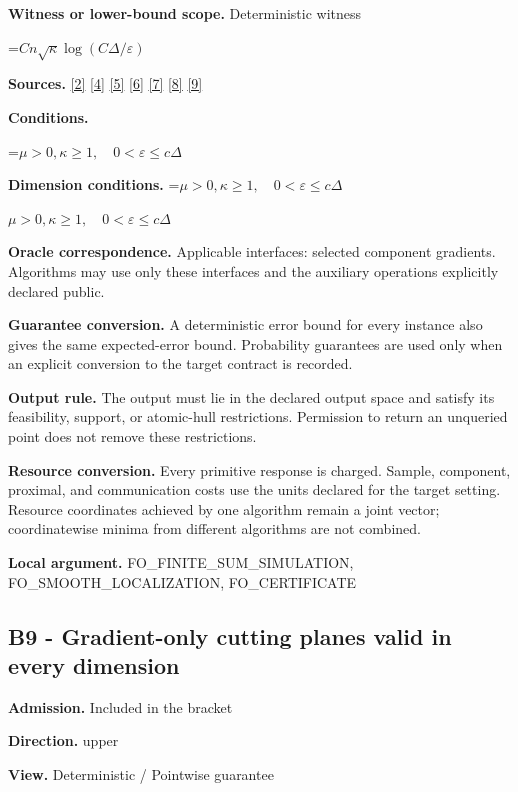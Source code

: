 \documentclass[10pt,a4paper]{article}
\newcommand{\AtlasMath}[1]{\par\begingroup\centering\setbox0=\hbox{$\displaystyle #1$}\ifdim\wd0>1.4\linewidth\typeout{ATLAS WIDE FORMULA: \the\wd0}\fi\ifdim\wd0>\linewidth\resizebox{\linewidth}{!}{\box0}\else\box0\fi\par\endgroup}
\newcommand{\AtlasInlineMath}[1]{\begingroup\setbox0=\hbox{$#1$}\ifdim\wd0>.4\linewidth\endgroup\AtlasMath{#1}\else\endgroup$#1$\fi}
\begin{document}
\textbf{Witness or lower-bound scope.} Deterministic witness

\AtlasMath{Cn\sqrt\kappa\log(C\Delta/\varepsilon)}
\textbf{Sources.} \href{https://proceedings.mlr.press/v97/zhou19b/zhou19b.pdf}{[2]} \href{https://arxiv.org/pdf/1405.4980}{[4]} \href{https://arxiv.org/pdf/2101.09740v2}{[5]} \href{https://arxiv.org/pdf/2609.33360v2}{[6]} \href{https://arxiv.org/pdf/2609.10874}{[7]} \href{https://www2.isye.gatech.edu/~nemirovs/MOR_AccuracyCertificates.pdf}{[8]} \href{https://arxiv.org/pdf/2609.20701}{[9]}

\textbf{Conditions.} 
\AtlasMath{\mu>0,\kappa\ge1,\quad0<\varepsilon\le c\Delta}


\textbf{Dimension conditions.} \AtlasInlineMath{\mu>0,\kappa\ge1,\quad0<\varepsilon\le c\Delta}

\textbf{Oracle correspondence.} Applicable interfaces: selected component gradients. Algorithms may use only these interfaces and the auxiliary operations explicitly declared public.

\textbf{Guarantee conversion.} A deterministic error bound for every instance also gives the same expected-error bound. Probability guarantees are used only when an explicit conversion to the target contract is recorded.

\textbf{Output rule.} The output must lie in the declared output space and satisfy its feasibility, support, or atomic-hull restrictions. Permission to return an unqueried point does not remove these restrictions.

\textbf{Resource conversion.} Every primitive response is charged. Sample, component, proximal, and communication costs use the units declared for the target setting. Resource coordinates achieved by one algorithm remain a joint vector; coordinatewise minima from different algorithms are not combined.

\textbf{Local argument.} FO\_\allowbreak{}FINITE\_\allowbreak{}SUM\_\allowbreak{}SIMULATION, FO\_\allowbreak{}SMOOTH\_\allowbreak{}LOCALIZATION, FO\_\allowbreak{}CERTIFICATE

\subsection{B9 - Gradient-only cutting planes valid in every dimension}
\textbf{Admission.} Included in the bracket

\textbf{Direction.} upper

\textbf{View.} Deterministic / Pointwise guarantee
\end{document}
